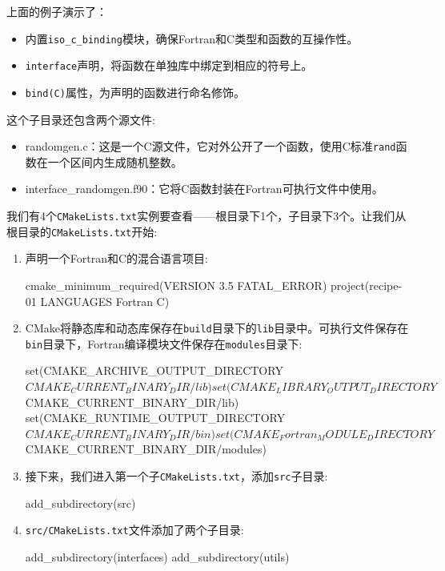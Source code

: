 上面的例子演示了：

\begin{itemize}
\item 内置\texttt{iso\_c\_binding}模块，确保Fortran和C类型和函数的互操作性。

\item \texttt{interface}声明，将函数在单独库中绑定到相应的符号上。

\item \texttt{bind(C)}属性，为声明的函数进行命名修饰。

\end{itemize}

这个子目录还包含两个源文件:

\begin{itemize}
\item randomgen.c：这是一个C源文件，它对外公开了一个函数，使用C标准\texttt{rand}函数在一个区间内生成随机整数。

\item interface\_randomgen.f90：它将C函数封装在Fortran可执行文件中使用。

\end{itemize}


我们有4个\texttt{CMakeLists.txt}实例要查看——根目录下1个，子目录下3个。让我们从根目录的\texttt{CMakeLists.txt}开始:

\begin{enumerate}
\item 声明一个Fortran和C的混合语言项目:

\begin{codebox}[cmake]
cmake_minimum_required(VERSION 3.5 FATAL_ERROR)
project(recipe-01 LANGUAGES Fortran C)
\end{codebox}

\item CMake将静态库和动态库保存在\texttt{build}目录下的\texttt{lib}目录中。可执行文件保存在\texttt{bin}目录下，Fortran编译模块文件保存在\texttt{modules}目录下:

\begin{codebox}[cmake]
set(CMAKE_ARCHIVE_OUTPUT_DIRECTORY ${CMAKE_CURRENT_BINARY_DIR}/lib)
set(CMAKE_LIBRARY_OUTPUT_DIRECTORY ${CMAKE_CURRENT_BINARY_DIR}/lib)
set(CMAKE_RUNTIME_OUTPUT_DIRECTORY ${CMAKE_CURRENT_BINARY_DIR}/bin)
set(CMAKE_Fortran_MODULE_DIRECTORY
${CMAKE_CURRENT_BINARY_DIR}/modules)
\end{codebox}

\item 接下来，我们进入第一个子\texttt{CMakeLists.txt}，添加\texttt{src}子目录:

\begin{codebox}[cmake]
add_subdirectory(src)
\end{codebox}

\item \texttt{src/CMakeLists.txt}文件添加了两个子目录:

\begin{codebox}[cmake]
add_subdirectory(interfaces)
add_subdirectory(utils)
\end{codebox}

\end{enumerate}

